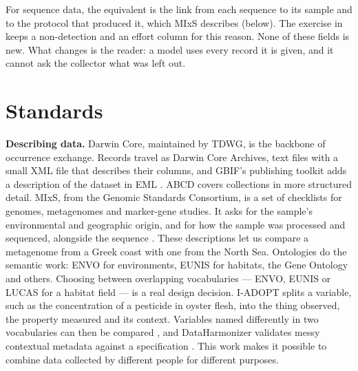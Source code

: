For sequence data, the equivalent is the link from each sequence to its sample
and to the protocol that produced it, which MIxS describes (below). The
exercise in  keeps a non-detection and an effort column
for this reason. None of these fields is new. What changes is the reader: a
model uses every record it is given, and it cannot ask the collector what was
left out.

\section{Standards}

\textbf{Describing data.} Darwin Core, maintained by TDWG, is the backbone of
occurrence exchange. Records travel as Darwin Core Archives, text files with a
small XML file that describes their columns, and GBIF's publishing toolkit adds
a description of the dataset in EML \parencite{wieczorek2012darwincore}. ABCD
covers collections in more structured detail. MIxS, from the Genomic Standards
Consortium, is a set of checklists for genomes, metagenomes and marker-gene
studies. It asks for the sample's environmental and geographic origin, and for
how the sample was processed and sequenced, alongside the sequence
\parencite{wieczorek2012darwincore}. These descriptions let us compare a
metagenome from a Greek coast with one from the North Sea. Ontologies do the semantic work: ENVO
for environments, EUNIS for habitats, the Gene Ontology and others. Choosing
between overlapping vocabularies --- ENVO, EUNIS or LUCAS for a habitat field ---
is a real design decision. I-ADOPT splits a variable, such as the concentration
of a pesticide in oyster flesh, into the thing observed, the property measured
and its context. Variables named differently in two vocabularies can then be
compared \parencite{magagna2021iadopt}, and DataHarmonizer validates messy
contextual metadata against a specification
\parencite{gill2023dataharmonizer}. This work makes it possible to combine data
collected by different people for different purposes.

